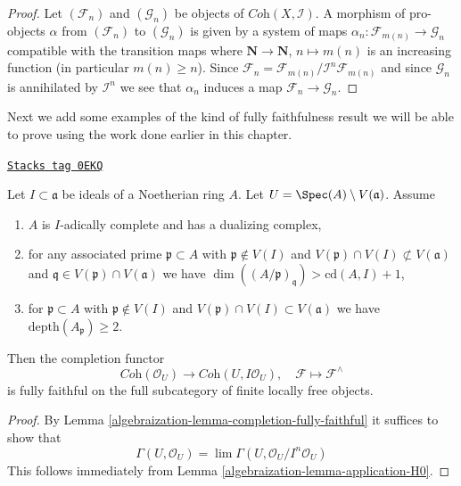 \begin{proof}
Let $(\mathcal{F}_n)$ and $(\mathcal{G}_n)$ be objects of
$\textit{Coh}(X, \mathcal{I})$. A morphism of pro-objects
$\alpha$ from $(\mathcal{F}_n)$ to $(\mathcal{G}_n)$ is given
by a system of maps
$\alpha_n : \mathcal{F}_{m(n)} \to \mathcal{G}_n$ compatible with
the transition maps where $\mathbf{N} \to \mathbf{N}$, $n \mapsto m(n)$
is an increasing function (in particular $m(n) \geq n$). Since
$\mathcal{F}_n = \mathcal{F}_{m(n)}/\mathcal{I}^n\mathcal{F}_{m(n)}$
and since $\mathcal{G}_n$ is annihilated by $\mathcal{I}^n$
we see that $\alpha_n$ induces a map $\mathcal{F}_n \to \mathcal{G}_n$.
\end{proof}

Next we add some examples of the kind of fully faithfulness
result we will be able to prove using the work done earlier in this chapter.

\begin{lemma}
\label{algebraization-lemma-fully-faithful}
\href{https://stacks.math.columbia.edu/tag/0EKQ}{\texttt{Stacks tag 0EKQ}}

Let $I \subset \mathfrak a$ be ideals of a Noetherian ring $A$.
Let $U = \Spec(A) \setminus V(\mathfrak a)$. Assume
\begin{enumerate}
\item $A$ is $I$-adically complete and has a dualizing complex,
\item for any associated prime $\mathfrak p \subset A$ with
$\mathfrak p \not \in V(I)$ and
$V(\mathfrak p) \cap V(I) \not \subset V(\mathfrak a)$ and
$\mathfrak q \in V(\mathfrak p) \cap V(\mathfrak a)$ we have
$\dim((A/\mathfrak p)_\mathfrak q) > \text{cd}(A, I) + 1$,
\item for $\mathfrak p \subset A$ with $\mathfrak p \not \in V(I)$
and $V(\mathfrak p) \cap V(I) \subset V(\mathfrak a)$
we have $\text{depth}(A_\mathfrak p) \geq 2$.
\end{enumerate}
Then the completion functor
$$
\textit{Coh}(\mathcal{O}_U)
\longrightarrow
\textit{Coh}(U, I\mathcal{O}_U),
\quad
\mathcal{F} \longmapsto \mathcal{F}^\wedge
$$
is fully faithful on the full subcategory of
finite locally free objects.
\end{lemma}

\begin{proof}

By Lemma \ref{algebraization-lemma-completion-fully-faithful}
it suffices to show that
$$
\Gamma(U, \mathcal{O}_U) =
\lim \Gamma(U, \mathcal{O}_U/I^n\mathcal{O}_U)
$$
This follows immediately from
Lemma \ref{algebraization-lemma-application-H0}.
\end{proof}

